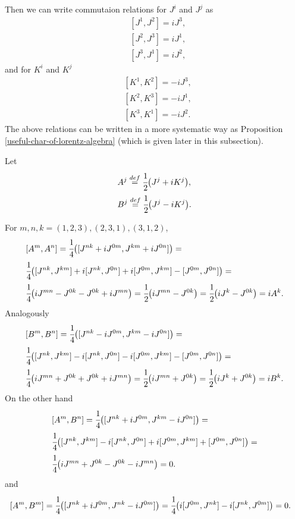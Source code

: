 \documentclass[main.tex]{subfiles}
\begin{document}
Then we can write commutaion relations for $J^i$ and $J^j$ as
\begin{align}
& [J^1, J^2] = i J^3,\\
& [J^2, J^3] = i J^1,\\
& [J^3, J^1] = i J^2,
\end{align}
and for $K^i$ and $K^j$
\begin{align}
& [K^1, K^2] = - i J^3,\\
& [K^2, K^3] = - i J^1,\\
& [K^3, K^1] = - i J^2.
\end{align}
The above relations can be written in a more systematic way as Proposition \ref{useful-char-of-lorentz-algebra} (which is given later in this subsection).

Let 
\begin{align*}
& A^j \stackrel{def}{=} \cfrac{1}{2}\big(J^j + iK^j\big),\\
& B^j \stackrel{def}{=} \cfrac{1}{2}\big(J^j - iK^j\big).
\end{align*}

For $m, n, k = (1, 2, 3), (2, 3, 1), (3, 1, 2)$,
\begin{align*}
& [A^m, A^n] = \cfrac{1}{4}\big([J^{nk} + iJ^{0m}, J^{km} + iJ^{0n}]\big) = \\
& \cfrac{1}{4}\big([J^{nk}, J^{km}] + i[J^{nk}, J^{0n}] + i[J^{0m}, J^{km}] - [J^{0m}, J^{0n}]\big) = \\
& \cfrac{1}{4}\big(iJ^{mn} - J^{0k} - J^{0k} + iJ^{mn}\big) = 
\cfrac{1}{2}\big(iJ^{mn} - J^{0k}\big) = \cfrac{1}{2}\big(i J^{k} - J^{0k}\big) = iA^k.
\end{align*}
Analogously
\begin{align*}
& [B^m, B^n] = \cfrac{1}{4}\big([J^{nk} - iJ^{0m}, J^{km} - iJ^{0n}]\big) = \\
& \cfrac{1}{4}\big([J^{nk}, J^{km}] - i[J^{nk}, J^{0n}] - i[J^{0m}, J^{km}] - [J^{0m}, J^{0n}]\big) = \\
& \cfrac{1}{4}\big(iJ^{mn} + J^{0k} + J^{0k} + iJ^{mn}\big) = 
\cfrac{1}{2}\big(iJ^{mn} + J^{0k}\big) = \cfrac{1}{2}\big(i J^{k} + J^{0k}\big) = iB^k.
\end{align*}
On the other hand
\begin{align*}
& [A^m, B^n] = \cfrac{1}{4}\big([J^{nk} + iJ^{0m}, J^{km} - iJ^{0n}]\big) = \\
& \cfrac{1}{4}\big([J^{nk}, J^{km}] - i[J^{nk}, J^{0n}] + i[J^{0m}, J^{km}] + [J^{0m}, J^{0n}]\big) = \\
& \cfrac{1}{4}\big(iJ^{mn} + J^{0k} - J^{0k} - iJ^{mn}\big) = 0.
\end{align*}
and
\begin{align*}
& [A^m, B^m] = \cfrac{1}{4}\big([J^{nk} + iJ^{0m}, J^{nk} - iJ^{0m}]\big) = 
\cfrac{1}{4}\big(i[J^{0m}, J^{nk}] - i[J^{nk}, J^{0m}]\big) = 0.
\end{align*}
\end{document}
